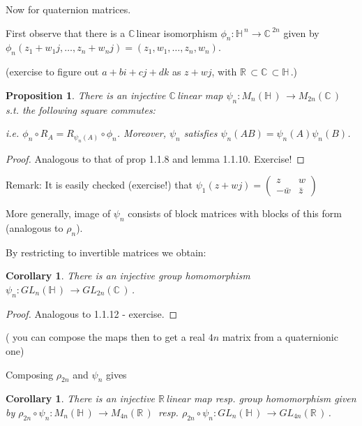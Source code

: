 \documentclass[12pt,a4paper]{article}
\newcommand{\rR}{\ensuremath{\mathbb{R}\,}}
\newcommand{\cC}{\ensuremath{\mathbb{C}\,}}
\newcommand{\hH}{\ensuremath{\mathbb{H}\,}}
\newcommand{\mnh}{\ensuremath{M_n(\hH)\,}}
\newcommand{\mr}[1]{\ensuremath{M_{#1}(\rR)\,}}
\newcommand{\mc}[1]{\ensuremath{M_{#1}(\cC)\,}}
\newcommand{\glnh}{\ensuremath{GL_n(\hH)\,}}
\newcommand{\glr}[1]{\ensuremath{GL_{#1}(\rR)\,}}
\newcommand{\glc}[1]{\ensuremath{GL_{#1}(\cC)\,}}
\newtheorem{prop}[thm]{Proposition}
\newtheorem{cor}[thm]{Corollary}
\begin{document}
Now for quaternion matrices. 

First observe that there is a \cC linear isomorphism $\phi_n: \hH^n \to \cC^{2n}$ given by $\phi_n(z_1+w_1 j, \ldots, z_n+w_n j)=(z_1,w_1,\ldots,z_n, w_n).$

(exercise to figure out $a+bi+cj+dk$ as  $z+wj$, with $\rR\subset \cC \subset \hH$.)

\begin{prop}
There is an injective \cC linear map $\psi_n:\mnh \to \mc{2n}$ s.t. the following square commutes:

\begin{center}
\end{center}

i.e. $\phi_n\circ R_A = R_{\psi_n(A)}\circ \phi_n$. Moreover, $\psi_n$ satisfies $\psi_n(AB)=\psi_n(A)\psi_n(B)$.
\end{prop}

\begin{proof}
Analogous to that of prop 1.1.8 and lemma 1.1.10. Exercise! 
\end{proof}

Remark: It is easily checked (exercise!) that $\psi_1(z+wj) = \begin{pmatrix} z &w \\ -\bar{w}& \bar{z}\end{pmatrix}$

More generally, image of $\psi_n$ consists of block matrices with blocks of this form (analogous to $\rho_n$).

By restricting to invertible matrices we obtain:

\begin{cor}
There is an injective group homomorphism $\psi_n:\glnh \to \glc{2n}$.
\end{cor}
\begin{proof}
Analogous to 1.1.12 - exercise.
\end{proof}

( you can compose the maps then to get a real $4n$ matrix from a quaternionic one)

Composing $\rho_{2n}$ and $\psi_n$ gives

 \begin{cor}
There is an injective \rR linear map resp. group homomorphism given by $\rho_{2n}\circ \psi_n:\mnh \to \mr{4n}$ resp. $\rho_{2n}\circ \psi_n:\glnh \to \glr{4n}$.
\end{cor}
\end{document}
